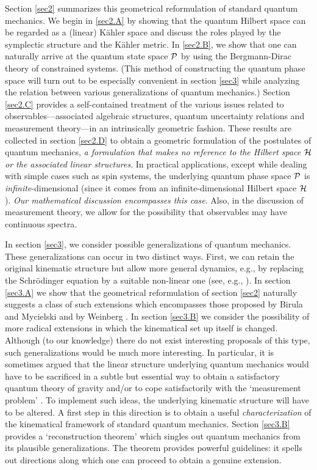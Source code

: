 Section \ref{sec2} summarizes this geometrical reformulation of
standard quantum mechanics. We begin in \ref{sec2.A} by showing that
the quantum Hilbert space can be regarded as a (linear) K\"ahler space
and discuss the roles played by the symplectic structure and the
K\"ahler metric. In \ref{sec2.B}, we show that one can naturally
arrive at the quantum state space ${\cal P}$ by using the
Bergmann-Dirac theory of constrained systems. (This method of
constructing the quantum phase space will turn out to be especially
convenient in section \ref{sec3} while analyzing the relation between
various generalizations of quantum mechanics.) Section \ref{sec2.C}
provides a self-contained treatment of the various issues related to
observables---associated algebraic structures, quantum uncertainty
relations and measurement theory---in an intrinsically geometric
fashion. These results are collected in section \ref{sec2.D} to obtain
a geometric formulation of the postulates of quantum mechanics, {\it a
formulation that makes no reference to the Hilbert space $\H$ or the
associated linear structures}. In practical applications, except while
dealing with simple cases such as spin systems, the underlying quantum
phase space $\P$ is {\it infinite}-dimensional (since it comes from an
infinite-dimensional Hilbert space $\H$). {\it Our mathematical
discussion encompasses this case}. Also, in the discussion of
measurement theory, we allow for the possibility that observables may
have continuous spectra.

In section \ref{sec3}, we consider possible generalizations of quantum
mechanics. These generalizations can occur in two distinct
ways. First, we can retain the original kinematic structure but allow
more general dynamics, e.g., by replacing the Schr\"odinger equation
by a suitable non-linear one (see, e.g., \cite{birula}).  In section
\ref{sec3.A} we show that the geometrical reformulation of section
\ref{sec2} naturally suggests a class of such extensions which
encompasses those proposed by Birula and Mycielski \cite{birula} and
by Weinberg \cite{weinberg}. In section \ref{sec3.B} we consider the
possibility of more radical extensions in which the kinematical set up
itself is changed.  Although (to our knowledge) there do not exist
interesting proposals of this type, such generalizations would be much
more interesting.  In particular, it is sometimes argued that the
linear structure underlying quantum mechanics would have to be
sacrificed in a subtle but essential way to obtain a satisfactory
quantum theory of gravity and/or to cope satisfactorily with the
`measurement problem' \cite{rp1}. To implement such ideas, the
underlying kinematic structure will have to be altered.  A first step
in this direction is to obtain a useful {\it characterization} of the
kinematical framework of standard quantum mechanics. Section
\ref{sec3.B} provides a `reconstruction theorem' which singles out
quantum mechanics from its plausible generalizations. The theorem
provides powerful guidelines: it spells out directions along which one
can proceed to obtain a genuine extension.

